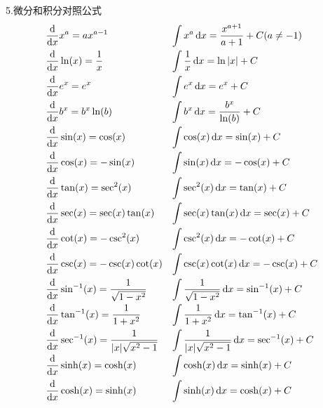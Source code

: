 5.微分和积分对照公式
\begin{displaymath}
\begin{array}{>{\displaystyle}l >{\displaystyle}l}
\dfrac{\dif}{\dif x}x^a=ax^{a-1} & \displaystyle\int x^a\dif x=\dfrac{x^{a+1}}{a+1}+C(a\neq -1)\\[2ex]
\dfrac{\dif}{\dif x}\ln(x)=\dfrac{1}{x} & \displaystyle\int\dfrac{1}{x}\dif x=\ln|x|+C\\[2ex]
\dfrac{\dif}{\dif x}e^x=e^x & \displaystyle\int e^x\dif x=e^x+C\\[2ex]
\dfrac{\dif}{\dif x}b^x=b^x\ln(b) & \displaystyle\int b^x\dif x=\dfrac{b^x}{\ln(b)}+C\\[2ex]
\dfrac{\dif}{\dif x}\sin(x)=\cos(x) & \displaystyle\int \cos(x)\dif x=\sin(x)+C\\[2ex]
\dfrac{\dif}{\dif x}\cos(x)=-\sin(x) & \displaystyle\int \sin(x)\dif x=-\cos(x)+C\\[2ex]
\dfrac{\dif}{\dif x}\tan(x)=\sec^2(x) & \displaystyle\int \sec^2(x)\dif x=\tan(x)+C\\[2ex]
\dfrac{\dif}{\dif x}\sec(x)=\sec(x)\tan(x) & \displaystyle\int \sec(x)\tan(x)\dif x=\sec(x)+C\\[2ex]
\dfrac{\dif}{\dif x}\cot(x)=-\csc^2(x) & \displaystyle\int \csc^2(x)\dif x=-\cot(x)+C\\[2ex]
\dfrac{\dif}{\dif x}\csc(x)=-\csc(x)\cot(x) & \displaystyle\int \csc(x)\cot(x)\dif x=-\csc(x)+C\\[2ex]
\dfrac{\dif}{\dif x}\sin^{-1}(x)=\dfrac{1}{\sqrt{1-x^2}} & \displaystyle\int \dfrac{1}{\sqrt{1-x^2}}\dif x=\sin^{-1}(x)+C\\[2ex]
\dfrac{\dif}{\dif x}\tan^{-1}(x)=\dfrac{1}{1+x^2} & \displaystyle\int \dfrac{1}{1+x^2}\dif x=\tan^{-1}(x)+C\\[2ex]
\dfrac{\dif}{\dif x}\sec^{-1}(x)=\dfrac{1}{|x|\sqrt{x^2-1}} & \displaystyle\int \dfrac{1}{|x|\sqrt{x^2-1}}\dif x=\sec^{-1}(x)+C\\[2ex]
\dfrac{\dif}{\dif x}\sinh(x)=\cosh(x) & \displaystyle\int \cosh(x)\dif x=\sinh(x)+C\\[2ex]
\dfrac{\dif}{\dif x}\cosh(x)=\sinh(x) & \displaystyle\int \sinh(x)\dif x=\cosh(x)+C
\end{array}
\end{displaymath}
